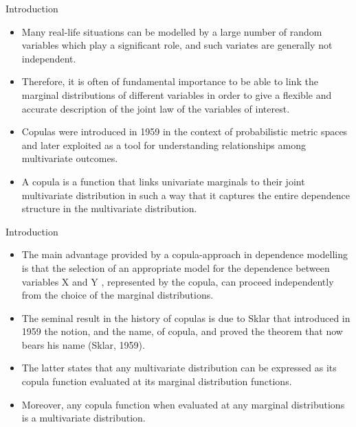 \documentclass[11pt]{beamer}
\theoremstyle{plain}
\theoremstyle{definition}
\theoremstyle{remark}
\begin{document}
%
\begin{frame}{Introduction}
   \begin{itemize}
      	\item  Many real-life situations can be modelled by a large number of random variables which play a significant role, and such 
      	variates are generally not independent. 
		\item Therefore, it is often of fundamental importance to be able to link the marginal distributions of different variables in order 
		to give a flexible and accurate description of the joint law of the variables of interest. 	
		\item Copulas were introduced in 1959 in the context of probabilistic metric spaces and later exploited as a tool for 
		understanding relationships among multivariate outcomes. 
		\item A copula is a function that links univariate marginals to their joint multivariate distribution in such a way that it captures 
		the entire dependence structure in the multivariate distribution. 
   \end{itemize}
\end{frame}
%
\begin{frame}{Introduction}
   \begin{itemize}
		\item The main advantage provided by a copula-approach in dependence modelling is that the selection of an appropriate model 
		for the dependence between variables X and Y , represented by the copula, can proceed independently from the choice of the 
		marginal distributions. 
		\item The seminal result in the history of copulas is due to Sklar that introduced in 1959 the notion, and the name, of copula, 
		and proved the theorem that now bears his name (Sklar, 1959). 
		\item The latter states that any multivariate distribution can be expressed as its copula function evaluated at its marginal 
		distribution functions. 
		\item Moreover, any copula function when evaluated at any marginal distributions is a multivariate distribution.
   \end{itemize}
\end{frame}
\end{document}
